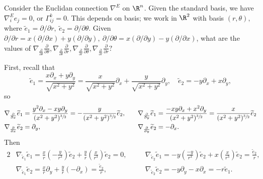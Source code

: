 \begin{example}
    Consider the Euclidan connection $\nabla ^E$ on $\R^n $. Given the standard basis, we have $\nabla^E _i e_j =0$, or $\Gamma _{ij}^k=0$. This depends on basis; we work in $\R^2$ with basis $(r,\theta),$ where $\widetilde e_1=\partial  /\partial r,\ \widetilde e_2=\partial /\partial \theta$. Given $\partial  /\partial r= x(\partial /\partial x)+y(\partial /\partial y),\ \partial /\partial \theta=x(\partial /\partial y)-y(\partial /\partial x)$, what are the values of $\nabla_{\frac{\partial}{\partial \theta}}\frac{\partial}{\partial \theta},\nabla _{\frac{\partial}{\partial \theta}}\frac{\partial}{\partial r},\nabla _{\frac{\partial}{\partial r}}\frac{\partial}{\partial \theta},\nabla _{\frac{\partial}{\partial r}}\frac{\partial}{\partial r}?$
%

First, recall that \[
\widetilde e_1= \frac{x \partial _x +y \partial _y}{\sqrt{x^2+y^2} }=\frac{x}{\sqrt{x^2+y^2} }\partial _x+\frac{y}{\sqrt{x^2+y^2} }\partial _y,\quad \widetilde e_2=-y\partial _x+x\partial _y,
\] so
    \begin{alignat*}{2} 
        &\nabla _{\frac{\partial}{\partial x}}\widetilde e_1=\frac{y^2 \partial _x-xy\partial _y}{(x^2+y^2)^{\sfrac{3}{2}} }=-\frac{y}{(x^2+y^2 )^{\sfrac{3}{2}}}\widetilde e_2,\quad &&\nabla _{\frac{\partial}{\partial y}}\widetilde e_1=\frac{-xy \partial _x+x^2\partial _y}{(x^2+y^2)^{\sfrac{3}{2}}}=\frac{x}{(x^2+y^2)^{\sfrac{3}{2}}}\widetilde e_2\\
        &\nabla _{\frac{\partial}{\partial x}}\widetilde e_2=\partial _y,&&\nabla _{\frac{\partial}{\partial y}}\widetilde e_2=-\partial _x.
    \end{alignat*}Then 
    \begin{alignat*}{2} 
        &\nabla _{\widetilde e_1}\widetilde e_1=\frac{x}{r}\left( -\frac{y}{r^3} \right) \widetilde e_2+\frac{y}{r}\left( \frac{x}{r^3} \right) \widetilde e_2=0,\quad
        &&\nabla _{\widetilde e_2}\widetilde e_1=-y \left( \frac{-y}{r^3} \right) \widetilde e_2+x\left( \frac{x}{r^3} \right) \widetilde e_2=\frac{\widetilde e_2}{r},\\
        &\nabla _{\widetilde e_1}\widetilde e_2=\frac{x}{r}\partial _y+\frac{y}{r}(-\partial _x)=\frac{\widetilde e_2}{r},
        &&\nabla _{\widetilde e_2}\widetilde e_2=-y \partial _y-x\partial _x=-r \widetilde e_1.
    \end{alignat*}
\end{example}

